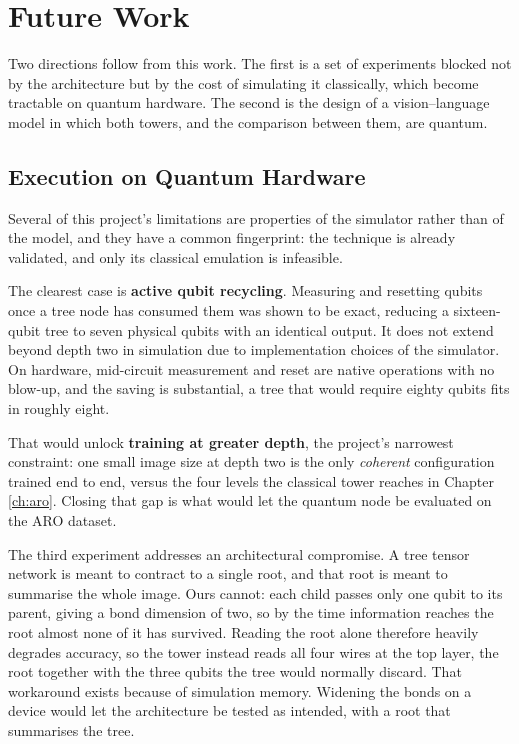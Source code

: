 \documentclass[12pt, a4paper, oneside]{report}
\begin{document}
\section{Future Work}

Two directions follow from this work. The first is a set of experiments blocked not by the architecture but by the cost of simulating it classically, which become tractable on quantum hardware. The second is the design of a vision--language model in which both towers, and the comparison between them, are quantum.

\subsection{Execution on Quantum Hardware}

Several of this project's limitations are properties of the simulator rather than of the model, and they have a common fingerprint: the technique is already validated, and only its classical emulation is infeasible.

The clearest case is \textbf{active qubit recycling}. Measuring and resetting qubits once a tree node has consumed them was shown to be exact, reducing a sixteen-qubit tree to seven physical qubits with an identical output. It does not extend beyond depth two in simulation due to implementation choices of the simulator. On hardware, mid-circuit measurement and reset are native operations with no blow-up, and the saving is substantial, a tree that would require eighty qubits fits in roughly eight.

That would unlock \textbf{training at greater depth}, the project's narrowest constraint: one small image size at depth two is the only \emph{coherent} configuration trained end to end, versus the four levels the classical tower reaches in Chapter \ref{ch:aro}. Closing that gap is what would let the quantum node be evaluated on the ARO dataset.

The third experiment addresses an architectural compromise. A tree tensor network is meant to contract to a single root, and that root is meant to summarise the whole image. Ours cannot: each child passes only one qubit to its parent, giving a bond dimension of two, so by the time information reaches the root almost none of it has survived. Reading the root alone therefore heavily degrades accuracy, so the tower instead reads all four wires at the top layer, the root together with the three qubits the tree would normally discard. That workaround exists because of simulation memory. Widening the bonds on a device would let the architecture be tested as intended, with a root that summarises the tree.
\end{document}
